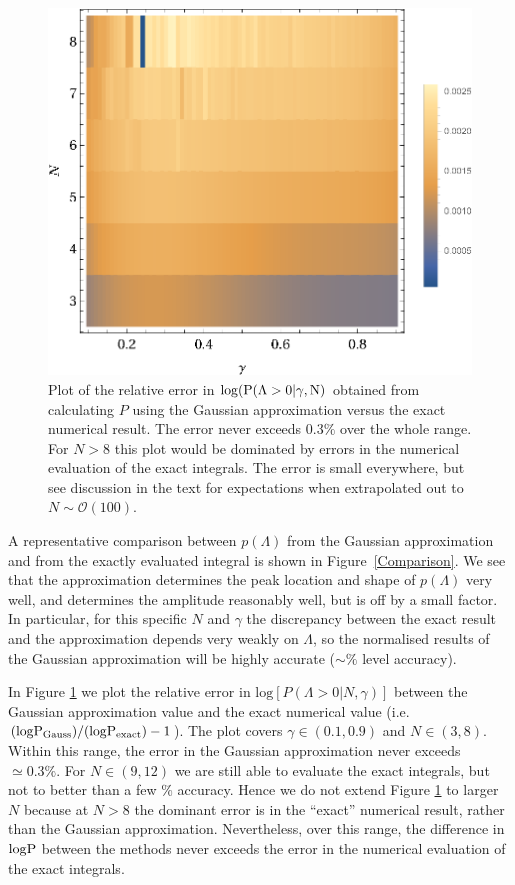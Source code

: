 \documentclass[12pt]{article}
\begin{document}
\begin{figure} 
  \centering
  \includegraphics[width=0.8 \linewidth]{errcontour.eps}
  \caption{Plot of the relative error in $\rm{log}(P(\Lambda>0|\gamma,N)$ obtained from calculating $P$ using the Gaussian approximation versus the exact numerical result. The error never exceeds $0.3 \%$ over the whole range. For $N>8$ this plot would be dominated by errors in the numerical evaluation of the exact integrals. The error is small everywhere, but see discussion in the text for expectations when extrapolated out to $N\sim  \mathcal{O}(100)$.}

  \label{errcontour}
\end{figure}

A representative comparison between $p(\Lambda)$ from the Gaussian approximation and from the exactly evaluated integral is shown in Figure~\ref{Comparison}. We see that the approximation determines the peak location and shape of $p(\Lambda)$ very well, and determines the amplitude reasonably well, but is off by a small factor. In particular, for this specific $N$ and $\gamma$ the discrepancy between the exact result and the approximation depends very weakly on $\Lambda$, so the normalised results of the Gaussian approximation will be highly accurate ($\sim\%$ level accuracy).

In Figure \ref{errcontour} we plot  the relative error in $\mathrm{log} \left[P(\Lambda>0|N,\gamma)\right]$ between the Gaussian approximation value and the exact numerical value (i.e. $(\rm{log} P_{\rm Gauss})/(\rm{log} P_{\rm exact}) -1$). The plot covers $\gamma \in (0.1,0.9)$ and $N \in (3,8)$.  Within this range, the error in the Gaussian approximation never exceeds $\simeq 0.3\%$. For $N \in (9,12)$ we are still able to evaluate the exact integrals, but not to better than a few $\%$ accuracy. Hence we do not extend Figure \ref{errcontour} to larger $N$ because at $N>8$ the dominant error is in the ``exact'' numerical result, rather than the Gaussian approximation. Nevertheless, over this range, the difference in $\rm{log} P$ between the methods never exceeds the error in the numerical evaluation of the exact integrals.
\end{document}
